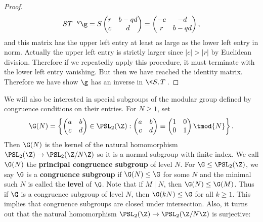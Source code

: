 \begin{proof}
        \[
          ST^{-q}\g = S\begin{pmatrix} r & b-qd \\ c & d \end{pmatrix} = \begin{pmatrix} -c & -d \\ r & b-qd \end{pmatrix},
        \]
        and this matrix has the upper left entry at least as large as the lower left entry in norm. Actually the upper left entry is strictly larger since $|c| > |r|$ by Euclidean division. Therefore if we repeatedly apply this procedure, it must terminate with the lower left entry vanishing. But then we have reached the identity matrix. Therefore we have show $\g$ has an inverse in $\<S,T\>$.
      \end{proof}

      We will also be interested in special subgroups of the modular group defined by congruence conditions on their entries. For $N \ge 1$, set
      \[
        \G(N) = \left\{\begin{pmatrix} a & b \\ c & d \end{pmatrix} \in \PSL_{2}(\Z):\begin{pmatrix} a & b \\ c & d \end{pmatrix} \equiv \begin{pmatrix} 1 & 0 \\ 0 & 1 \end{pmatrix} \tmod{N}\right\}.
      \]
      Then $\G(N)$ is the kernel of the natural homomorphism $\PSL_{2}(\Z) \to \PSL_{2}(\Z/N\Z)$ so it is a normal subgroup with finite index. We call $\G(N)$ the \textbf{principal congruence subgroup} of level $N$. For $\G \le \PSL_{2}(\Z)$, we say $\G$ is a \textbf{congruence subgroup} if $\G(N) \le \G$ for some $N$ and the minimal such $N$ is called the \textbf{level} of $\G$. Note that if $M \mid N$, then $\G(N) \le \G(M)$. Thus if $\G$ is a congruence subgroup of level $N$, then $\G(kN) \le \G$ for all $k \ge 1$. This implies that congruence subgroups are closed under intersection. Also, it turns out that the natural homomorphism $\PSL_{2}(\Z) \to \PSL_{2}(\Z/N\Z)$ is surjective:

